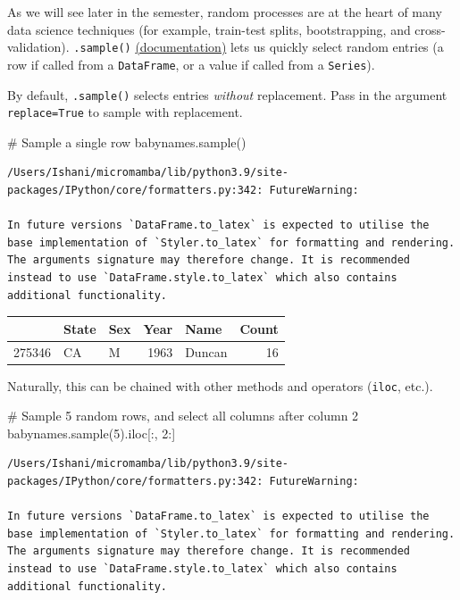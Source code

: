 \documentclass[
  letterpaper,
  DIV=11,
  numbers=noendperiod]{scrreprt}
\newenvironment{Shaded}{\begin{snugshade}}{\end{snugshade}}
\newcommand{\CommentTok}[1]{\textcolor[rgb]{0.37,0.37,0.37}{#1}}
\newcommand{\DecValTok}[1]{\textcolor[rgb]{0.68,0.00,0.00}{#1}}
\newcommand{\NormalTok}[1]{\textcolor[rgb]{0.00,0.23,0.31}{#1}}
\begin{document}
As we will see later in the semester, random processes are at the heart
of many data science techniques (for example, train-test splits,
bootstrapping, and cross-validation). \texttt{.sample()}
\href{https://pandas.pydata.org/docs/reference/api/pandas.DataFrame.sample.html}{(documentation)}
lets us quickly select random entries (a row if called from a
\texttt{DataFrame}, or a value if called from a \texttt{Series}).

By default, \texttt{.sample()} selects entries \emph{without}
replacement. Pass in the argument \texttt{replace=True} to sample with
replacement.

\begin{Shaded}
\begin{Highlighting}[]
\CommentTok{\# Sample a single row}
\NormalTok{babynames.sample()}
\end{Highlighting}
\end{Shaded}

\begin{verbatim}
/Users/Ishani/micromamba/lib/python3.9/site-packages/IPython/core/formatters.py:342: FutureWarning:

In future versions `DataFrame.to_latex` is expected to utilise the base implementation of `Styler.to_latex` for formatting and rendering. The arguments signature may therefore change. It is recommended instead to use `DataFrame.style.to_latex` which also contains additional functionality.
\end{verbatim}

\begin{tabular}{lllrlr}
\toprule
{} & State & Sex &  Year &    Name &  Count \\
\midrule
275346 &    CA &   M &  1963 &  Duncan &     16 \\
\bottomrule
\end{tabular}

Naturally, this can be chained with other methods and operators
(\texttt{iloc}, etc.).

\begin{Shaded}
\begin{Highlighting}[]
\CommentTok{\# Sample 5 random rows, and select all columns after column 2}
\NormalTok{babynames.sample(}\DecValTok{5}\NormalTok{).iloc[:, }\DecValTok{2}\NormalTok{:]}
\end{Highlighting}
\end{Shaded}

\begin{verbatim}
/Users/Ishani/micromamba/lib/python3.9/site-packages/IPython/core/formatters.py:342: FutureWarning:

In future versions `DataFrame.to_latex` is expected to utilise the base implementation of `Styler.to_latex` for formatting and rendering. The arguments signature may therefore change. It is recommended instead to use `DataFrame.style.to_latex` which also contains additional functionality.
\end{verbatim}
\end{document}
